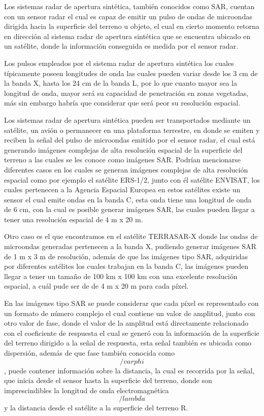 Los sistemas radar de apertura sintética, también conocidos como SAR, cuentan con un sensor radar el cual es capaz de emitir un pulso de ondas de microondas dirigida hacia la superficie del terreno u objeto, el cual en cierto momento retorna en dirección al sistema radar de apertura sintética que se encuentra ubicado en un satélite, donde la información conseguida es medida por el sensor radar. 

Los pulsos empleados por el sistema radar de apertura sintética los cuales típicamente poseen longitudes de onda las cuales pueden variar desde los 3 cm de la banda X, hasta los 24 cm de la banda L, por lo que cuanto mayor sea la longitud de onda, mayor será su capacidad de penetración en zonas vegetadas, más sin embargo habría que considerar que será peor su resolución espacial.

Los sistemas radar de apertura sintética pueden ser transportados mediante un satélite, un avión o permanecer en una plataforma terrestre, en donde se emiten y reciben la señal del pulso de microondas emitido por el sensor radar, el cual está generando imágenes complejas de alta resolución espacial de la superficie del terreno a las cuales se les conoce como imágenes SAR. 
Podrían mencionarse diferentes casos en los cuales se generan imágenes complejas de alta resolución espacial como por ejemplo el satélite ERS-1/2, junto con él satélite ENVISAT, los cuales pertenecen a la Agencia Espacial Europea en estos satélites existe un sensor el cual emite ondas en la banda C, esta onda tiene una longitud de onda de 6 cm, con la cual es posible generar imágenes SAR, las cuales pueden llegar a tener una resolución espacial de 4 m x 20 m. 

Otro caso es el que encontramos en el satélite TERRASAR-X donde las ondas de microondas generadas pertenecen a la banda X, pudiendo generar imágenes SAR de 1 m x 3 m de resolución, además de que las imágenes tipo SAR, adquiridas por diferentes satélites los cuales trabajan en la banda C, las imágenes pueden llegar a tener un tamaño de 100 km x 100 km con una excelente resolución espacial, a cuál pude ser de de 4 m x 20 m para cada píxel. 

En las imágenes tipo SAR se puede considerar que cada píxel es representado con un formato de número complejo el cual contiene un valor de amplitud, junto con otro valor de fase, donde el valor de la amplitud está directamente relacionado con el coeficiente de respuesta el cual se generó con la información de la superficie del terreno dirigido a la señal de respuesta, esta señal también es ubicada como dispersión, además de que fase también conocida como $$/varphi$$, puede contener información sobre la distancia, la cual es recorrida por la señal, que inicia desde el sensor hasta la superficie del terreno, donde son imprescindibles la longitud de onda electromagnética $$/lambda$$ y la distancia desde el satélite a la superficie del terreno R.

